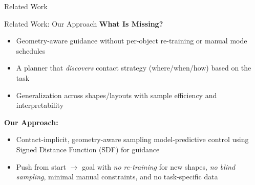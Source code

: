 \documentclass[10pt, aspectratio=169]{beamer}
\begin{document}
\begin{frame}{Related Work}
\end{frame}

\begin{frame}{Related Work: Our Approach}
  \textbf{What Is Missing?}
  \begin{itemize}
    \item Geometry-aware guidance without per-object re-training or manual mode schedules
    \item A planner that \emph{discovers} contact strategy (where/when/how) based on the task
    \item Generalization across shapes/layouts with sample efficiency and interpretability
  \end{itemize}

  \vspace{0.8em}
  \textbf{Our Approach:}
  \begin{itemize}
    \item Contact-implicit, geometry-aware sampling model-predictive control using Signed Distance Function (SDF) for guidance
    \item Push from start $\rightarrow$ goal with \emph{no re-training} for new shapes, \emph{no blind sampling}, minimal manual constraints, and no task-specific data
  \end{itemize}
\end{frame}

\end{document}
